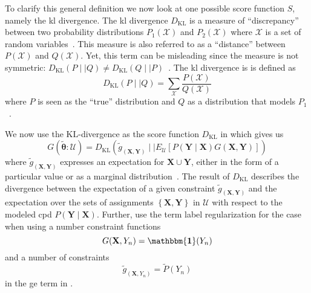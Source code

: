 \bigskip

To clarify this general definition we now look at one possible score function $S$, namely the \acrfull{kl} divergence.
The \gls{kl} divergence $D_{\text{KL}}$ is a measure of ``discrepancy'' between two probability distributions $P_1(\mathcal{X})$ and $P_2(\mathcal{X})$ where $\mathcal{X}$ is a set of \glspl{random variable}~\citep{burnham2003model}.
This measure is also referred to as a ``distance'' between $P(\mathcal{X})$ and $Q(\mathcal{X})$.
Yet, this term can be misleading since the measure is not symmetric: $D_{\text{KL}}(P\mid\mid Q)\neq D_{\text{KL}}(Q\mid\mid P)$~\citep{burnham2003model}.
The \gls{kl} divergence is is defined as~\citep{mackay2003information}
\begin{equation}
  \label{equ:kl-divergence}
  D_{\text{KL}}(P\mid\mid Q)=\sum_\mathcal{X} \frac{P(\mathcal{X})}{Q(\mathcal{X})}
\end{equation}
where $P$ is seen as the ``true'' distribution and $Q$ as a distribution that models $P_1$~\citep{burnham2003model}.

\bigskip

We now use the $\text{KL}$-divergence as the score function $D_{\text{KL}}$ in  which gives us~\citep{mann2010generalized}
\begin{equation}
  \label{equ:generalized-expectation-kl}
  G(\bm{\tilde{\theta}}:\mathcal{U})=D_{\text{KL}}\left(\tilde{g}_{\left(\mathbf{X},\mathbf{Y}\right)}\mid\mid E_{\mathcal{U}}\left[P(\mathbf{Y}\mid\mathbf{X})G(\mathbf{X},\mathbf{Y})\right]\right)
\end{equation}
where $\tilde{g}_{\left(\mathbf{X},\mathbf{Y}\right)}$ expresses an expectation for $\mathbf{X}\cup\mathbf{Y}$, either in the form of a particular value or as a \gls{marginal distribution}~\citep{mann2010generalized}.
The result of $D_{\text{KL}}$ describes the divergence between the expectation of a given constraint $\tilde{g}_{\left(\mathbf{X},\mathbf{Y}\right)}$ and the expectation over the sets of assignments $\left\{\mathbf{X},\mathbf{Y}\right\}$ in $\mathcal{U}$ with respect to the modeled \gls{cpd} $P(\mathbf{Y}\mid\mathbf{X})$.
Further, \citet{mann2010generalized} use the term \gls{label regularization} for the case when using a number constraint functions
\begin{equation}
  \label{equ:label-regularization-constraint-function}
  G(\mathbf{X},Y_n)=\mathbf{\mathbbm{1}}(Y_n)
\end{equation}
and a number of constraints
\begin{equation}
  \label{equ:label-regularization-constraints}
  \tilde{g}_{\left(\mathbf{X},Y_n\right)}=\tilde{P}(Y_n)
\end{equation}
in the \gls{ge} term in .

